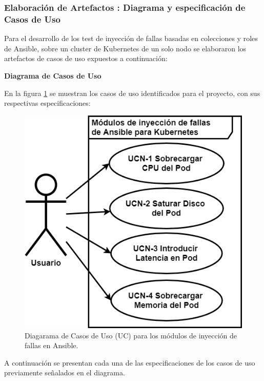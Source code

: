 \subsubsection{Elaboración de Artefactos : Diagrama y especificación de Casos de Uso}
\par Para el desarrollo de los test de inyección de fallas basadas en colecciones y roles de Ansible, sobre un cluster de Kubernetes de un solo nodo se elaboraron los artefactos de casos de uso expuestos a continuación:\\


\par \textbf{Diagrama de Casos de Uso}\\


\par En la figura \ref{fig:uc01} se muestran los casos de uso identificados para el proyecto, con sus respectivas especificaciones:

\begin{figure}[htpb!]
	\centering
	\includegraphics[width=0.75\columnwidth]{images/usecase/ucfaultinjectionF.png}
	\caption{Diagarama de Casos de Uso (UC) para los módulos de inyección de fallas en Ansible.}
	\label{fig:uc01}
\end{figure}

\par A continuación se presentan cada una de las especificaciones de los casos de uso previamente señalados en el diagrama.
\pagebreak

